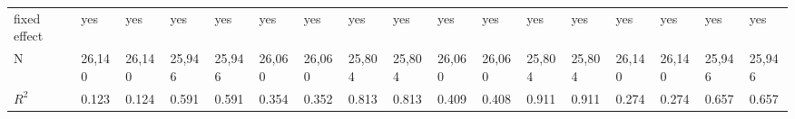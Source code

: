 \begin{tabular}{lllllllllllllllll}
fixed effect                 &                                 yes &                                 yes &                                 yes &                                 yes &                                 yes &                                 yes &                                 yes &                                 yes &                                 yes &                                 yes &                                yes &                                yes &                                 yes &                                yes &                                yes &                                yes \\
N                            &                              26,140 &                              26,140 &                              25,946 &                              25,946 &                              26,060 &                              26,060 &                              25,804 &                              25,804 &                              26,060 &                              26,060 &                             25,804 &                             25,804 &                              26,140 &                             26,140 &                             25,946 &                             25,946 \\
$R^2$                        &                               0.123 &                               0.124 &                               0.591 &                               0.591 &                               0.354 &                               0.352 &                               0.813 &                               0.813 &                               0.409 &                               0.408 &                              0.911 &                              0.911 &                               0.274 &                              0.274 &                              0.657 &                              0.657 \\
\bottomrule
\end{tabular}
